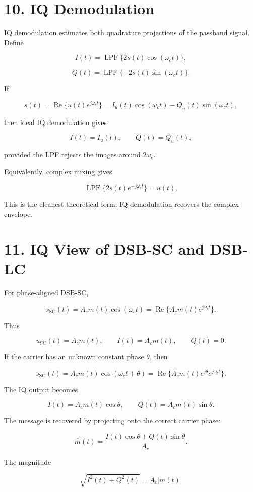 \documentclass[11pt]{article}
\begin{document}
\section{10. IQ Demodulation}

IQ demodulation estimates both quadrature projections of the passband signal. Define

\[
I(t)=\operatorname{LPF}\{2s(t)\cos(\omega_c t)\},
\]

\[
Q(t)=\operatorname{LPF}\{-2s(t)\sin(\omega_c t)\}.
\]

If

\[
s(t)=\operatorname{Re}\{u(t)e^{j\omega_c t}\}
=I_u(t)\cos(\omega_c t)-Q_u(t)\sin(\omega_c t),
\]

then ideal IQ demodulation gives

\[
I(t)=I_u(t),
\qquad
Q(t)=Q_u(t),
\]

provided the LPF rejects the images around $2\omega_c$.

Equivalently, complex mixing gives

\[
\operatorname{LPF}\{2s(t)e^{-j\omega_c t}\}=u(t).
\]

This is the cleanest theoretical form: IQ demodulation recovers the complex envelope.

\section{11. IQ View of DSB-SC and DSB-LC}

For phase-aligned DSB-SC,

\[
s_{\mathrm{SC}}(t)=A_c m(t)\cos(\omega_c t)
=\operatorname{Re}\{A_c m(t)e^{j\omega_c t}\}.
\]

Thus

\[
u_{\mathrm{SC}}(t)=A_c m(t),
\qquad
I(t)=A_c m(t),
\qquad
Q(t)=0.
\]

If the carrier has an unknown constant phase $\theta$, then

\[
s_{\mathrm{SC}}(t)=A_c m(t)\cos(\omega_c t+\theta)
=\operatorname{Re}\{A_c m(t)e^{j\theta}e^{j\omega_c t}\}.
\]

The IQ output becomes

\[
I(t)=A_c m(t)\cos\theta,
\qquad
Q(t)=A_c m(t)\sin\theta.
\]

The message is recovered by projecting onto the correct carrier phase:

\[
\widehat{m}(t)=\frac{I(t)\cos\theta+Q(t)\sin\theta}{A_c}.
\]

The magnitude

\[
\sqrt{I^2(t)+Q^2(t)}=A_c|m(t)|
\]
\end{document}
